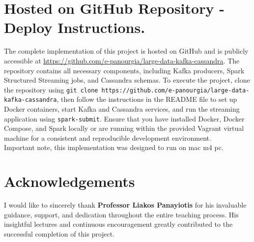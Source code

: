 \documentclass[a4paper,11pt]{article}
\theoremstyle{mytheor}
\begin{document}
\section*{Hosted on GitHub Repository - Deploy Instructions.}
The complete implementation of this project is hosted on GitHub and is publicly accessible at \url{https://github.com/e-panourgia/large-data-kafka-cassandra}. The repository contains all necessary components, including Kafka producers, Spark Structured Streaming jobs, and Cassandra schemas. To execute the project, clone the repository using \texttt{git clone https://github.com/e-panourgia/large-data-kafka-cassandra}, then follow the instructions in the README file to set up Docker containers, start Kafka and Cassandra services, and run the streaming application using \texttt{spark-submit}. Ensure that you have installed Docker, Docker Compose, and Spark locally or are running within the provided Vagrant virtual machine for a consistent and reproducible development environment. \\

Important note, this implementation was designed to run on mac m4 pc.

\section*{Acknowledgements}
I would like to sincerely thank \textbf{Professor Liakos Panayiotis} for his invaluable guidance, support, and dedication throughout the entire teaching process. His insightful lectures and continuous encouragement greatly contributed to the successful completion of this project.
\end{document}
